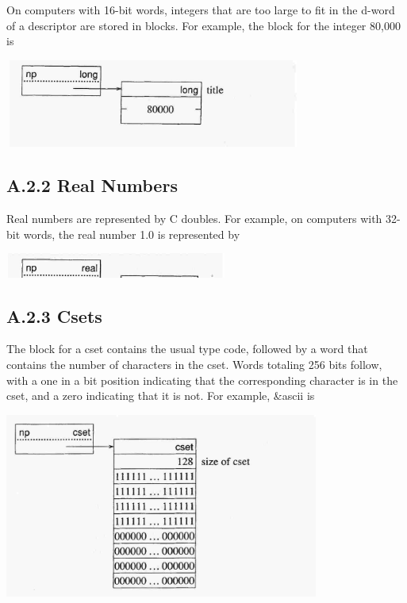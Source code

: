 On computers with 16-bit words, integers that are too large to fit in
the d-word of a descriptor are stored in blocks.  For example, the
block for the integer 80,000 is


\includegraphics[width=3.848in,height=1.1425in]{ib-img/ib-img114.jpg} 

\subsection[A.2.2 Real Numbers]{A.2.2 Real Numbers}

Real numbers are represented by C doubles. For example, on computers
with 32-bit words, the real number 1.0 is represented by


\includegraphics[width=2.8846in,height=0.3134in]{ib-img/ib-img115.jpg} 

\subsection{A.2.3 Csets}

The block for a cset contains the usual type code, followed by a word
that contains the number of characters in the cset. Words totaling 256
bits follow, with a one in a bit position indicating that the
corresponding character is in the cset, and a zero indicating that it
is not. For example, \&ascii is

\includegraphics[width=4.0602in,height=2.3874in]{ib-img/ib-img116.jpg} 

